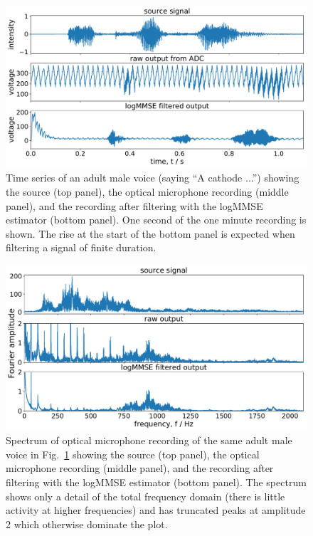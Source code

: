 \documentclass[paper-main.tex]{subfiles}
\begin{document}
\begin{figure}
	\includegraphics[width=\textwidth]{figures/combined_timeseries_melatos.pdf}
	\caption{Time series of an adult male voice (saying ``A cathode ...'') showing the source (top panel), the optical microphone recording (middle panel), and the recording after filtering with the logMMSE estimator (bottom panel). One second of the one minute recording is shown. The rise at the start of the bottom panel is expected when filtering a signal of finite duration.}
	\label{fig:logMMSE_timeseries}
\end{figure}

\begin{figure}
	\includegraphics[width=\textwidth]{figures/combined_spectrum_melatos.pdf}
	\caption{Spectrum of optical microphone recording of the same adult male voice in Fig.~\ref{fig:logMMSE_timeseries} showing the source (top panel), the optical microphone recording (middle panel), and the recording after filtering with the logMMSE estimator (bottom panel). The spectrum shows only a detail of the total frequency domain (there is little activity at higher frequencies) and has truncated peaks at amplitude 2 which otherwise dominate the plot.}
	\label{fig:logMMSE_spectrum}
\end{figure}
\end{document}
